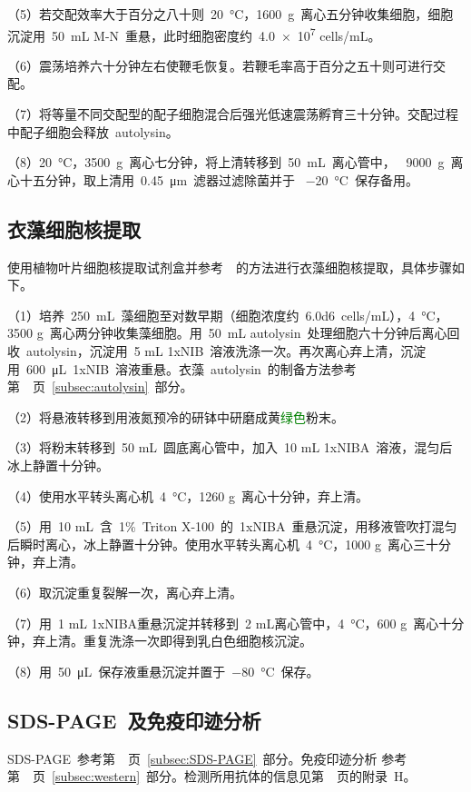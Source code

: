 （5）若交配效率大于百分之八十则\ \SI{20}{\degreeCelsius}，\SI{1600}{\g}\ 离心五分钟收集细胞，细胞沉淀用\ \SI{50}{\mL}{} M-N\ 重悬，此时细胞密度约\ \num{4.0e7}{} cells/\si{\mL}。

（6）震荡培养六十分钟左右使鞭毛恢复。若鞭毛率高于百分之五十则可进行交配。

（7）将等量不同交配型的配子细胞混合后强光低速震荡孵育三十分钟。交配过程中配子细胞会释放\ autolysin。

（8）\SI{20}{\degreeCelsius}，\SI{3500}{\g}\ 离心七分钟，将上清转移到\ \SI{50}{\mL}\ 离心管中，
\ \SI{9000}{\g}\ 离心十五分钟，取上清用\ \SI{0.45}{\um}\ 滤器过滤除菌并于
\ \SI{-20}{\degreeCelsius}\ 保存备用。

\subsection{衣藻细胞核提取}
使用植物叶片细胞核提取试剂盒并参考\ \citet{Winck2011}\ 的方法进行衣藻细胞核提取，具体步骤如下。

（1）培养\ \SI{250}{\mL}\ 藻细胞至对数早期（细胞浓度约\ \num{6.0d6}\  cells/mL），\SI{4}{\degreeCelsius}，3500 g\ 离心两分钟收集藻细胞。用\ \SI{50}{\mL}{} autolysin\ 处理细胞六十分钟后离心回收\ autolysin，沉淀用\ 5 mL 1xNIB\ 溶液洗涤一次。再次离心弃上清，沉淀用\ \SI{600}{\uL}\  1xNIB\ 溶液重悬。衣藻\ autolysin\ 的制备方法参考第\ \pageref{subsec:autolysin}\ 页\
\ref{subsec:autolysin}\ 部分。

（2）将悬液转移到用液氮预冷的研钵中研磨成黄\textcolor{green}{绿色}粉末。

（3）将粉末转移到\ 50 mL\ 圆底离心管中，加入\ 10 mL 1xNIBA\ 溶液，混匀后冰上静置十分钟。

（4）使用水平转头离心机\ \SI{4}{\degreeCelsius}，1260 g\ 离心十分钟，弃上清。

（5）用\ 10 mL\ 含\ 1\%\ Triton X-100\ 的\ 1xNIBA\ 重悬沉淀，用移液管吹打混匀后瞬时离心，冰上静置十分钟。使用水平转头离心机\ \SI{4}{\degreeCelsius}，1000 g\ 离心三十分钟，弃上清。

（6）取沉淀重复裂解一次，离心弃上清。

（7）用\ 1 mL 1xNIBA重悬沉淀并转移到\ 2 mL离心管中，\SI{4}{\degreeCelsius}，600 g\ 离心十分钟，弃上清。重复洗涤一次即得到乳白色细胞核沉淀。

（8）用\ \SI{50}{\uL}\ 保存液重悬沉淀并置于\ \SI{-80}{\degreeCelsius}\ 保存。

\subsection{SDS-PAGE\ 及免疫印迹分析}
SDS-PAGE\ 参考第\ \pageref{subsec:SDS-PAGE}\ 页\ \ref{subsec:SDS-PAGE}\ 部分。免疫印迹分析
参考第\ \pageref{subsec:western}\ 页\ \ref{subsec:western}\ 部分。检测所用抗体的信息见第\
\pageref{appen:H}\ 页的附录\ H。

